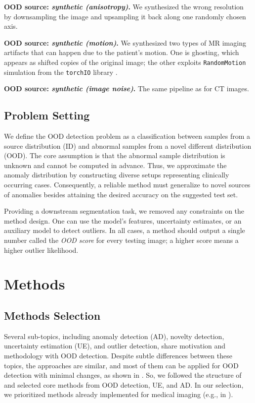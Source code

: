 \textbf{OOD source: \textit{synthetic (anisotropy)}.} We synthesized the wrong resolution by downsampling the image and upsampling it back along one randomly chosen axis.


\textbf{OOD source: \textit{synthetic (motion)}.} We synthesized two types of MR imaging artifacts that can happen due to the patient's motion. One is ghosting, which appears as shifted copies of the original image; the other exploits \texttt{RandomMotion} simulation from the \texttt{torchIO} library \cite{torchio}.

\textbf{OOD source: \textit{synthetic (image noise)}.} The same pipeline as for CT images.


\subsection{Problem Setting}

We define the OOD detection problem as a classification between samples from a source distribution (ID) and abnormal samples from a novel different distribution (OOD). The core assumption is that the abnormal sample distribution is unknown and cannot be computed in advance. Thus, we approximate the anomaly distribution by constructing diverse setups representing clinically occurring cases. Consequently, a reliable method must generalize to novel sources of anomalies besides attaining the desired accuracy on the suggested test set.

Providing a downstream segmentation task, we removed any constraints on the method design. One can use the model's features, uncertainty estimates, or an auxiliary model to detect outliers. In all cases, a method should output a single number called the \textit{OOD score} for every testing image; a higher score means a higher outlier likelihood.


\section{Methods}

\subsection{Methods Selection}

Several sub-topics, including anomaly detection (AD), novelty detection, uncertainty estimation (UE), and outlier detection, share motivation and methodology with OOD detection. Despite subtle differences between these topics, the approaches are similar, and most of them can be applied for OOD detection with minimal changes, as shown in \cite{yang2022openood}. So, we followed the structure of \cite{yang2022openood} and selected core methods from OOD detection, UE, and AD. In our selection, we prioritized methods already implemented for medical imaging (e.g., in \cite{karimi2022improving,jungo2019assessing,zimmerer2022mood}).

